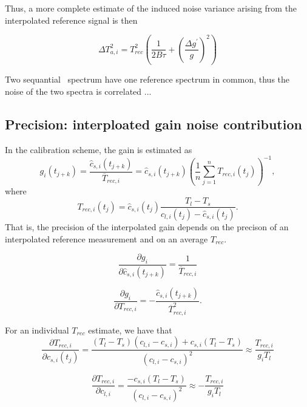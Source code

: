 Thus, a more complete estimate of the induced noise variance arising from the
interpolated reference signal is then

\begin{equation}
\Delta T_{a,i}^2 = T_{rec}^{2}\left(\frac{1}{2B\tau} + \left(\frac{\Delta g^{'}}{g}\right)^{2}\right)
\end{equation}
 
Two sequantial \smr\ spectrum have one reference spectrum in common, thus the noise
of the two spectra is correlated ...  
   
\subsection*{Precision: interploated gain noise contribution}

In the calibration scheme, the gain is estimated as
\begin{equation}
g_{i}(t_{j+k}) = \frac{\hat{c}_{s,i}(t_{j+k})}{\overline{T}_{rec,i}} = \hat{c}_{s,i}(t_{j+k})\left(\frac{1}{n}\sum_{j=1}^{n}T_{rec,i}(t_{j})\right)^{-1}, 
\end{equation}
where
\begin{equation}
T_{rec,i}(t_{j}) = \hat{c}_{s,i}(t_{j}) \frac{ T_{l} - T_{s} }{  c_{l,i}(t_{j})- \hat{c}_{s,i}(t_{j})  }.
\end{equation}
That is, the precision of the interpolated gain depends on the precison of an interpolated
reference measurement and on an average \(T_{rec}\). 

\begin{equation}
\frac{\partial g_{i}}{\partial \hat{c}_{s,i}(t_{j+k})} = \frac{1}{\overline{T}_{rec,i}}
\end{equation}

\begin{equation}
\frac{\partial g_{i}}{\partial T_{rec,i}} = - \frac{\hat{c}_{s,i}(t_{j+k})}{\overline{T}_{rec,i}^2}.
\end{equation}

For an individual \(T_{rec}\) estimate, we have that
\begin{equation}
 \frac{\partial T_{rec,i}}{\partial c_{s,i}(t_{j})} = \frac{(T_{l}-T_{s})(c_{l,i}-c_{s,i}) + c_{s,i}(T_{l}-T_{s})}
{(c_{l,i}-c_{s,i})^2} \approx \frac{T_{rec,i}}{g_{i}T_{l}}
\end{equation}

\begin{equation}
 \frac{\partial T_{rec,i}}{\partial c_{l,i}} = \frac{-c_{s,i}(T_{l}-T_{s})}{(c_{l,i}-c_{s,i})^2} \approx -\frac{T_{rec,i}}{g_{i}T_{l}}
\end{equation}


